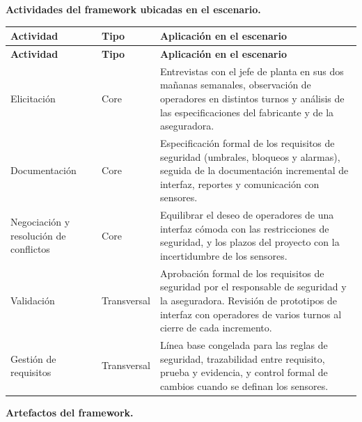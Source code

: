 \documentclass[12pt,a4paper]{article}
\begin{document}
\textbf{Actividades del framework ubicadas en el escenario.}

{\small
\setlength{\tabcolsep}{4pt}
\renewcommand{\arraystretch}{1.3}
\begin{longtable}{
|>{\raggedright\arraybackslash}p{}
|>{\raggedright\arraybackslash}p{}
|>{\raggedright\arraybackslash}p{}|}
\hline
\textbf{Actividad} & \textbf{Tipo} & \textbf{Aplicación en el escenario} \\
\hline
\endfirsthead
\hline
\textbf{Actividad} & \textbf{Tipo} & \textbf{Aplicación en el escenario} \\
\hline
\endhead
Elicitación & Core & Entrevistas con el jefe de planta en sus dos mañanas semanales, observación de operadores en distintos turnos y análisis de las especificaciones del fabricante y de la aseguradora. \\
\hline
Documentación & Core & Especificación formal de los requisitos de seguridad (umbrales, bloqueos y alarmas), seguida de la documentación incremental de interfaz, reportes y comunicación con sensores. \\
\hline
Negociación y resolución de conflictos & Core & Equilibrar el deseo de operadores de una interfaz cómoda con las restricciones de seguridad, y los plazos del proyecto con la incertidumbre de los sensores. \\
\hline
Validación & Transversal & Aprobación formal de los requisitos de seguridad por el responsable de seguridad y la aseguradora. Revisión de prototipos de interfaz con operadores de varios turnos al cierre de cada incremento. \\
\hline
Gestión de requisitos & Transversal & Línea base congelada para las reglas de seguridad, trazabilidad entre requisito, prueba y evidencia, y control formal de cambios cuando se definan los sensores. \\
\hline
\end{longtable}
}

\textbf{Artefactos del framework.}
\end{document}
